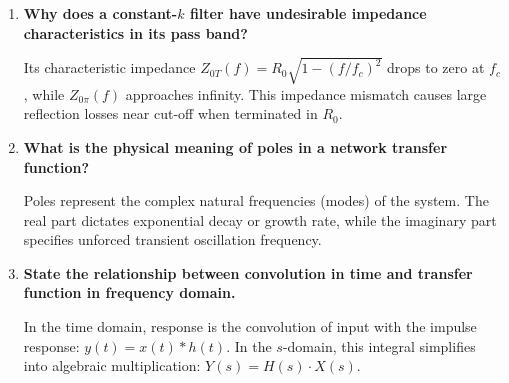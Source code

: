 \documentclass[12pt,a4paper]{article}
\newcommand{\Q}[1]{\textbf{#1}\par\noindent\ignorespaces}
\begin{document}
\newpage

\begin{tcolorbox}[exambox, top=3pt, bottom=3pt, title={\textbf{Frequently Asked / Viva Questions (Part 2)}}]
\begin{enumerate}[topsep=0pt, label=\textbf{Q\arabic*.}, itemsep=1.8pt, start=8]
  \item \Q{Why does a constant-$k$ filter have undesirable impedance characteristics in its pass band?}
  Its characteristic impedance $Z_{0T}(f) = R_0\sqrt{1 - (f/f_c)^2}$ drops to zero at $f_c$, while $Z_{0\pi}(f)$ approaches infinity. This impedance mismatch causes large reflection losses near cut-off when terminated in $R_0$.

  \item \Q{What is the physical meaning of poles in a network transfer function?}
  Poles represent the complex natural frequencies (modes) of the system. The real part dictates exponential decay or growth rate, while the imaginary part specifies unforced transient oscillation frequency.

  \item \Q{State the relationship between convolution in time and transfer function in frequency domain.}
  In the time domain, response is the convolution of input with the impulse response: $y(t) = x(t) * h(t)$. In the $s$-domain, this integral simplifies into algebraic multiplication: $Y(s) = H(s) \cdot X(s)$.
\end{enumerate}
\end{tcolorbox}

\vspace{2pt}
\end{document}
